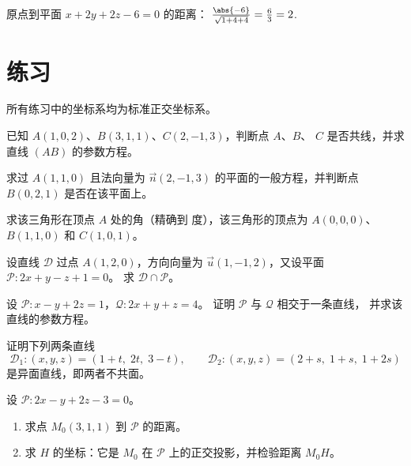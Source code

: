 \begin{example}\label{ex:g12:space:distance}
原点到平面 $x + 2y + 2z - 6 = 0$ 的距离：
$\frac{\abs{-6}}{\sqrt{1 + 4 + 4}} = \frac63 = 2$.
\end{example}

\section{练习}

所有练习中的坐标系均为标准正交坐标系。

\begin{exercise}[$\star$]\label{exo:g12:space:1}
已知 $A(1, 0, 2)$、$B(3, 1, 1)$、$C(2, -1, 3)$，判断点 $A$、$B$、
$C$ 是否共线，并求直线 $(AB)$ 的参数方程。
\end{exercise}

\begin{exercise}[$\star$]\label{exo:g12:space:2}
求过 $A(1, 1, 0)$ 且法向量为
$\vec n(2, -1, 3)$ 的平面的一般方程，并判断点 $B(0, 2, 1)$ 是否在该平面上。
\end{exercise}

\begin{exercise}[$\star$]\label{exo:g12:space:3}
求该三角形在顶点 $A$ 处的角（精确到
度），该三角形的顶点为 $A(0,0,0)$、$B(1, 1, 0)$ 和 $C(1, 0, 1)$。
\end{exercise}

\begin{exercise}[$\star\star$]\label{exo:g12:space:4}
设直线 $\mathcal D$ 过点 $A(1, 2, 0)$，方向向量为
$\vec u(1, -1, 2)$，又设平面 $\mathcal P : 2x + y - z + 1 = 0$。
求 $\mathcal D \cap \mathcal P$。
\end{exercise}

\begin{exercise}[$\star\star$]\label{exo:g12:space:5}
设 $\mathcal P : x - y + 2z = 1$，$\mathcal Q : 2x + y + z = 4$。
证明 $\mathcal P$ 与 $\mathcal Q$ 相交于一条直线，
并求该直线的参数方程。
\end{exercise}

\begin{exercise}[$\star\star$]\label{exo:g12:space:6}
证明下列两条直线
\[
\mathcal D_1 : (x, y, z) = (1 + t,\; 2t,\; 3 - t), \qquad
\mathcal D_2 : (x, y, z) = (2 + s,\; 1 + s,\; 1 + 2s)
\]
是异面直线，即两者不共面。
\end{exercise}

\begin{exercise}[$\star\star$]\label{exo:g12:space:7}
设 $\mathcal P : 2x - y + 2z - 3 = 0$。
\begin{enumerate}
  \item 求点 $M_0(3, 1, 1)$ 到 $\mathcal P$ 的距离。
  \item 求 $H$ 的坐标：它是
        $M_0$ 在 $\mathcal P$ 上的正交投影，并检验距离 $M_0H$。
\end{enumerate}
\end{exercise}

